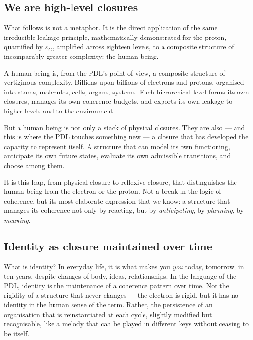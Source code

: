 \documentclass[12pt, a4paper, openright]{book}
\begin{document}
\subsection*{We are high-level closures}

What follows is not a metaphor. It is the direct application of the same irreducible-leakage principle, mathematically demonstrated for the proton, quantified by $\varepsilon_G$, amplified across eighteen levels, to a composite structure of incomparably greater complexity: the human being.

\medskip

A human being is, from the PDL’s point of view, a composite structure of vertiginous complexity. Billions upon billions of electrons and protons, organised into atoms, molecules, cells, organs, systems. Each hierarchical level forms its own closures, manages its own coherence budgets, and exports its own leakage to higher levels and to the environment.

\medskip

But a human being is not only a stack of physical closures. They are also — and this is where the PDL touches something new — a closure that has developed the capacity to represent itself. A structure that can model its own functioning, anticipate its own future states, evaluate its own admissible transitions, and choose among them.

\medskip

It is this leap, from physical closure to reflexive closure, that distinguishes the human being from the electron or the proton. Not a break in the logic of coherence, but its most elaborate expression that we know: a structure that manages its coherence not only by reacting, but by \emph{anticipating}, by \emph{planning}, by \emph{meaning}.

\subsection*{Identity as closure maintained over time}

What is identity? In everyday life, it is what makes you \emph{you} today, tomorrow, in ten years, despite changes of body, ideas, relationships. In the language of the PDL, identity is the maintenance of a coherence pattern over time. Not the rigidity of a structure that never changes — the electron is rigid, but it has no identity in the human sense of the term. Rather, the persistence of an organisation that is reinstantiated at each cycle, slightly modified but recognisable, like a melody that can be played in different keys without ceasing to be itself.
\end{document}
